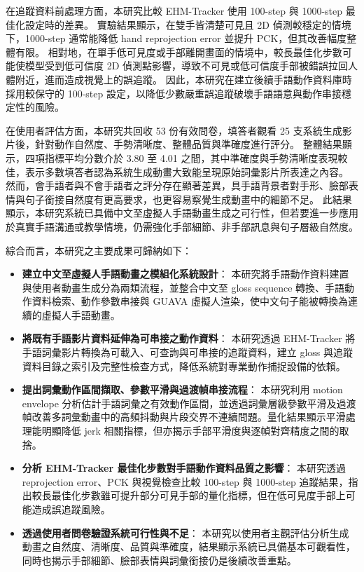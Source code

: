 \documentclass[class=NCU_thesis, crop=false]{standalone}
\begin{document}
在追蹤資料前處理方面，本研究比較 EHM-Tracker 使用 100-step 與 1000-step 最佳化設定時的差異。
實驗結果顯示，在雙手皆清楚可見且 2D 偵測較穩定的情境下，1000-step 通常能降低 hand reprojection error 並提升 PCK，但其改善幅度整體有限。
相對地，在單手低可見度或手部離開畫面的情境中，較長最佳化步數可能使模型受到低可信度 2D 偵測點影響，導致不可見或低可信度手部被錯誤拉回人體附近，進而造成視覺上的誤追蹤。
因此，本研究在建立後續手語動作資料庫時採用較保守的 100-step 設定，以降低少數嚴重誤追蹤破壞手語語意與動作串接穩定性的風險。

在使用者評估方面，本研究共回收 53 份有效問卷，填答者觀看 25 支系統生成影片後，針對動作自然度、手勢清晰度、整體品質與準確度進行評分。
整體結果顯示，四項指標平均分數介於 3.80 至 4.01 之間，其中準確度與手勢清晰度表現較佳，表示多數填答者認為系統生成動畫大致能呈現原始詞彙影片所表達之內容。
然而，會手語者與不會手語者之評分存在顯著差異，具手語背景者對手形、臉部表情與句子銜接自然度有更高要求，也更容易察覺生成動畫中的細節不足。
此結果顯示，本研究系統已具備中文至虛擬人手語動畫生成之可行性，但若要進一步應用於真實手語溝通或教學情境，仍需強化手部細節、非手部訊息與句子層級自然度。

綜合而言，本研究之主要成果可歸納如下：

\begin{itemize}
    \item \textbf{建立中文至虛擬人手語動畫之模組化系統設計}：
    本研究將手語動作資料建置與使用者動畫生成分為兩類流程，並整合中文至 gloss sequence 轉換、手語動作資料檢索、動作參數串接與 GUAVA 虛擬人渲染，使中文句子能被轉換為連續的虛擬人手語動畫。

    \item \textbf{將既有手語影片資料延伸為可串接之動作資料}：
    本研究透過 EHM-Tracker 將手語詞彙影片轉換為可載入、可查詢與可串接的追蹤資料，建立 gloss 與追蹤資料目錄之索引及完整性檢查方式，降低系統對專業動作捕捉設備的依賴。

    \item \textbf{提出詞彙動作區間擷取、參數平滑與過渡幀串接流程}：
    本研究利用 motion envelope 分析估計手語詞彙之有效動作區間，並透過詞彙層級參數平滑及過渡幀改善多詞彙動畫中的高頻抖動與片段交界不連續問題。量化結果顯示平滑處理能明顯降低 jerk 相關指標，但亦揭示手部平滑度與逐幀對齊精度之間的取捨。

    \item \textbf{分析 EHM-Tracker 最佳化步數對手語動作資料品質之影響}：
    本研究透過 reprojection error、PCK 與視覺檢查比較 100-step 與 1000-step 追蹤結果，指出較長最佳化步數雖可提升部分可見手部的量化指標，但在低可見度手部上可能造成誤追蹤風險。

    \item \textbf{透過使用者問卷驗證系統可行性與不足}：
    本研究以使用者主觀評估分析生成動畫之自然度、清晰度、品質與準確度，結果顯示系統已具備基本可觀看性，同時也揭示手部細節、臉部表情與詞彙銜接仍是後續改善重點。
\end{itemize}
\end{document}
